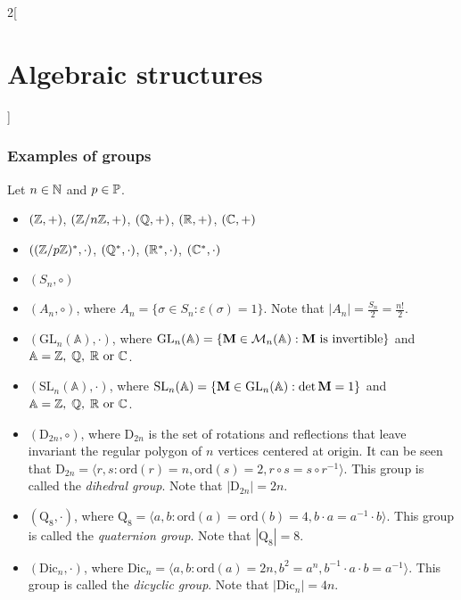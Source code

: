 \documentclass[../../../main.tex]{subfiles}
\begin{document}
\begin{multicols}{2}[\section{Algebraic structures}]
  \subsubsection{Examples of groups}\label{AS-examples}
  Let $n\in\mathbb{N}$ and $p\in\mathbb{P}$.
  \begin{itemize}
    \item $(\mathbb{Z},+)$, $(\mathbb{Z}/n\mathbb{Z},+)$, $(\mathbb{Q},+)$, $(\mathbb{R},+)$, $(\mathbb{C},+)$
    \item $((\mathbb{Z}/p\mathbb{Z})^*,\cdot)$, $(\mathbb{Q}^*,\cdot)$, $(\mathbb{R}^*,\cdot)$, $(\mathbb{C}^*,\cdot)$
    \item $(S_n,\circ)$
    \item $(A_n,\circ)$, where $A_n=\{\sigma\in S_n:\varepsilon(\sigma)=1\}$. Note that $|A_n|=\frac{S_n}{2}=\frac{n!}{2}$.
    \item $(\text{GL}_n(\mathbb{A}),\cdot)$, where $\text{GL}_n(\mathbb{A})=\{\boldsymbol{\mathrm{M}}\in\mathcal{M}_n(\mathbb{A}):\boldsymbol{\mathrm{M}}\text{ is invertible}\}$ and $\mathbb{A}=\mathbb{Z},\;\mathbb{Q},\;\mathbb{R}\text{ or }\mathbb{C}$.
    \item $(\text{SL}_n(\mathbb{A}),\cdot)$, where $\text{SL}_n(\mathbb{A})=\{\boldsymbol{\mathrm{M}}\in\text{GL}_n(\mathbb{A}):\det\boldsymbol{\mathrm{M}}=1\}$ and $\mathbb{A}=\mathbb{Z},\;\mathbb{Q},\;\mathbb{R}\text{ or }\mathbb{C}$.
    \item $(\text{D}_{2n},\circ)$, where $\text{D}_{2n}$ is the set of rotations and reflections that leave invariant the regular polygon of $n$ vertices centered at origin. It can be seen that $\text{D}_{2n}=\langle r,s:\text{ord}(r)=n,\text{ord}(s)=2,r\circ s=s\circ r^{-1}\rangle$. This group is called the \textit{dihedral group}. Note that $|\text{D}_{2n}|=2n$.
    \item $(\text{Q}_8,\cdot)$, where $\text{Q}_8=\langle a,b:\text{ord}(a)=\text{ord}(b)=4,b\cdot a=a^{-1}\cdot b\rangle$. This group is called the \textit{quaternion group}. Note that $|\text{Q}_8|=8$.
    \item $(\text{Dic}_n,\cdot)$, where $\text{Dic}_n=\langle a,b:\text{ord}(a)=2n,b^2=a^n,b^{-1}\cdot a\cdot b=a^{-1}\rangle$. This group is called the \textit{dicyclic group}. Note that $|\text{Dic}_n|=4n$.
  \end{itemize}

\end{multicols}
\end{document}
